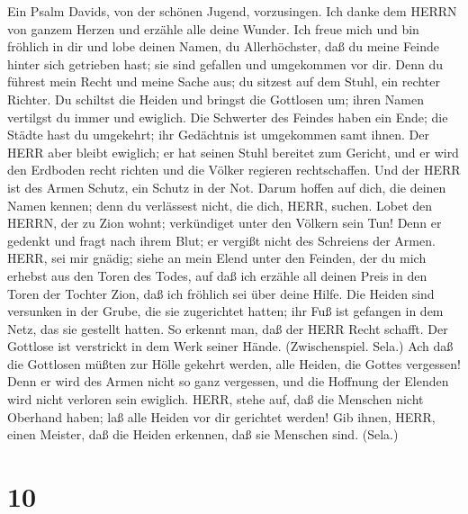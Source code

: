  Ein Psalm Davids, von der schönen Jugend, vorzusingen. Ich
danke dem HERRN von ganzem Herzen und erzähle alle deine Wunder.
 Ich freue mich und bin fröhlich in dir und lobe deinen
Namen, du Allerhöchster,  daß du meine Feinde hinter sich
getrieben hast; sie sind gefallen und umgekommen vor dir. 
Denn du führest mein Recht und meine Sache aus; du sitzest auf dem
Stuhl, ein rechter Richter.  Du schiltst die Heiden und
bringst die Gottlosen um; ihren Namen vertilgst du immer und ewiglich.
 Die Schwerter des Feindes haben ein Ende; die Städte hast
du umgekehrt; ihr Gedächtnis ist umgekommen samt ihnen.  Der
HERR aber bleibt ewiglich; er hat seinen Stuhl bereitet zum Gericht,
 und er wird den Erdboden recht richten und die Völker
regieren rechtschaffen.  Und der HERR ist des Armen Schutz,
ein Schutz in der Not.  Darum hoffen auf dich, die deinen
Namen kennen; denn du verlässest nicht, die dich, HERR, suchen.
 Lobet den HERRN, der zu Zion wohnt; verkündiget unter den
Völkern sein Tun!  Denn er gedenkt und fragt nach ihrem
Blut; er vergißt nicht des Schreiens der Armen.  HERR, sei
mir gnädig; siehe an mein Elend unter den Feinden, der du mich erhebst
aus den Toren des Todes,  auf daß ich erzähle all deinen
Preis in den Toren der Tochter Zion, daß ich fröhlich sei über deine
Hilfe.  Die Heiden sind versunken in der Grube, die sie
zugerichtet hatten; ihr Fuß ist gefangen in dem Netz, das sie gestellt
hatten.  So erkennt man, daß der HERR Recht schafft. Der
Gottlose ist verstrickt in dem Werk seiner Hände. (Zwischenspiel. Sela.)
 Ach daß die Gottlosen müßten zur Hölle gekehrt werden,
alle Heiden, die Gottes vergessen!  Denn er wird des Armen
nicht so ganz vergessen, und die Hoffnung der Elenden wird nicht
verloren sein ewiglich.  HERR, stehe auf, daß die Menschen
nicht Oberhand haben; laß alle Heiden vor dir gerichtet werden!
 Gib ihnen, HERR, einen Meister, daß die Heiden erkennen,
daß sie Menschen sind. (Sela.)

\hypertarget{section-9}{%
\section{10}\label{section-9}}

